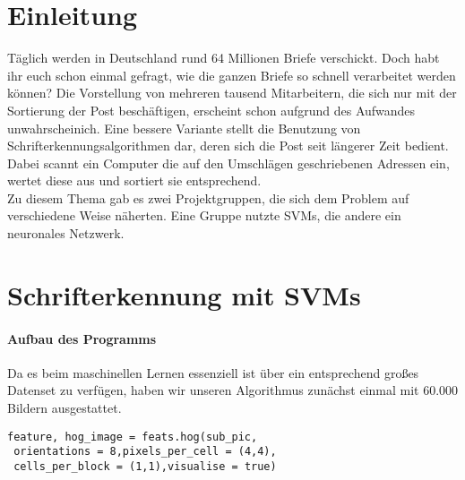\section{Einleitung}

Täglich werden in Deutschland rund 64 Millionen Briefe verschickt. Doch habt ihr euch schon einmal gefragt, wie die ganzen Briefe so schnell verarbeitet werden können? Die Vorstellung von mehreren tausend Mitarbeitern, die sich nur mit der Sortierung der Post beschäftigen, erscheint schon aufgrund des Aufwandes unwahrscheinich. Eine bessere Variante stellt die Benutzung von Schrifterkennungsalgorithmen dar, deren sich die Post seit längerer Zeit bedient. Dabei scannt ein Computer die auf den Umschlägen geschriebenen Adressen ein, wertet diese aus und sortiert sie entsprechend. \\
Zu diesem Thema gab es zwei Projektgruppen, die sich dem Problem auf verschiedene Weise näherten. Eine Gruppe nutzte SVMs, die andere ein neuronales Netzwerk.


\section{Schrifterkennung mit SVMs}

\paragraph{Aufbau des Programms}

Da es beim maschinellen Lernen essenziell ist über ein entsprechend großes Datenset zu verfügen, haben wir unseren Algorithmus zunächst einmal mit 60.000 Bildern ausgestattet. 

\begin{verbatim}
feature, hog_image = feats.hog(sub_pic,
 orientations = 8,pixels_per_cell = (4,4),
 cells_per_block = (1,1),visualise = true)
\end{verbatim}

